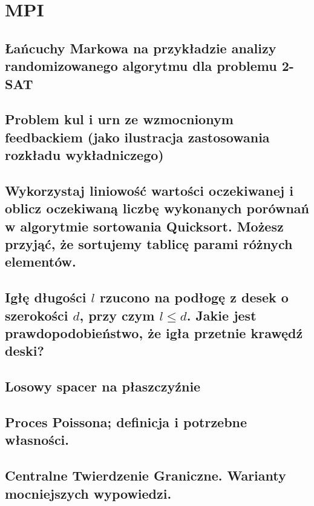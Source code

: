 \chapter{MPI}

\section{Łańcuchy Markowa na przykładzie analizy randomizowanego algorytmu dla problemu 2-SAT}


\section{Problem kul i urn ze wzmocnionym feedbackiem (jako ilustracja zastosowania rozkładu wykładniczego)}


\section{Wykorzystaj liniowość wartości oczekiwanej i oblicz oczekiwaną liczbę wykonanych porównań w algorytmie sortowania Quicksort. Możesz przyjąć, że sortujemy tablicę parami różnych elementów.}


\section{Igłę długości \texorpdfstring{\(l\)}{l} rzucono na podłogę z desek o szerokości \texorpdfstring{\(d\)}{d}, przy czym \texorpdfstring{\(l \leq d\)}{l <= d}. Jakie jest prawdopodobieństwo, że igła przetnie krawędź deski?}


\section{Losowy spacer na płaszczyźnie}


\section{Proces Poissona; definicja i potrzebne własności.}


\section{Centralne Twierdzenie Graniczne. Warianty mocniejszych wypowiedzi.}
